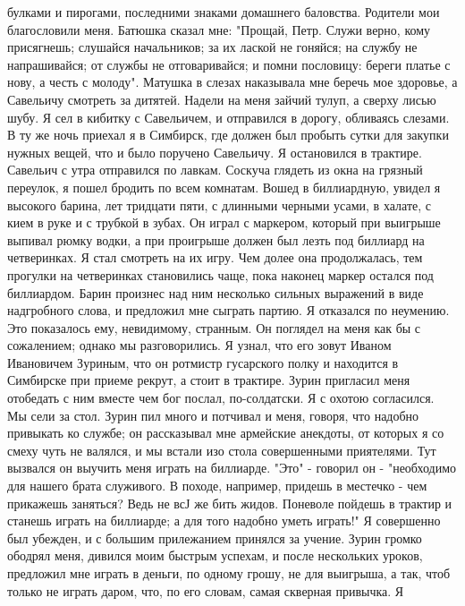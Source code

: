 булками  и пирогами, последними  знаками  домашнего баловства.  Родители мои
благословили меня.  Батюшка сказал  мне:  "Прощай, Петр.  Служи  верно, кому
присягнешь; слушайся  начальников;  за их  лаской  не гоняйся;  на службу не
напрашивайся; от службы не отговаривайся; и помни пословицу: береги платье с
нову,  а  честь  с  молоду".  Матушка  в  слезах наказывала мне  беречь  мое
здоровье, а Савельичу смотреть за  дитятей. Надели на  меня зайчий тулуп,  а
сверху лисью шубу.  Я сел в  кибитку  с Савельичем,  и  отправился в дорогу,
обливаясь слезами.
В  ту  же ночь приехал я в Симбирск,  где должен  был пробыть сутки для
закупки  нужных  вещей, что  и  было  поручено  Савельичу.  Я остановился  в
трактире.  Савельич с утра отправился по лавкам. Соскуча глядеть  из окна на
грязный переулок, я пошел  бродить  по  всем  комнатам. Вошед в биллиардную,
увидел  я высокого барина,  лет тридцати пяти, с  длинными черными усами,  в
халате, с кием в руке и с трубкой в зубах. Он играл с маркером, который  при
выигрыше выпивал рюмку  водки, а при проигрыше должен был лезть под биллиард
на  четверинках. Я стал смотреть на их игру. Чем долее она продолжалась, тем
прогулки  на четверинках становились чаще, пока наконец  маркер  остался под
биллиардом.  Барин  произнес над  ним  несколько  сильных выражений  в  виде
надгробного слова, и предложил мне  сыграть партию. Я отказался по неумению.
Это  показалось  ему,  невидимому,  странным. Он  поглядел  на меня как бы с
сожалением;  однако  мы  разговорились.  Я  узнал,  что   его  зовут  Иваном
Ивановичем Зуриным, что он ротмистр гусарского полку и находится в Симбирске
при  приеме рекрут, а стоит в трактире. Зурин пригласил меня отобедать с ним
вместе чем бог послал, по-солдатски. Я с охотою согласился. Мы сели за стол.
Зурин  пил много и потчивал и меня, говоря, что надобно привыкать ко службе;
он  рассказывал  мне  армейские  анекдоты,  от  которых я со смеху  чуть  не
валялся,  и мы  встали изо стола  совершенными  приятелями.  Тут вызвался он
выучить меня  играть  на биллиарде. "Это"  -  говорил он -  "необходимо  для
нашего  брата  служивого.  В  походе,  например, придешь  в  местечко  - чем
прикажешь заняться?  Ведь не всЈ же бить жидов. Поневоле пойдешь в трактир и
станешь играть на биллиарде; а для  того надобно уметь играть!" Я совершенно
был  убежден,  и  с большим  прилежанием принялся  за  учение.  Зурин громко
ободрял  меня,  дивился  моим  быстрым  успехам, и после  нескольких уроков,
предложил мне играть в деньги, по одному грошу, не для выигрыша, а так, чтоб
только  не играть даром,  что, по  его словам,  самая скверная  привычка.  Я
